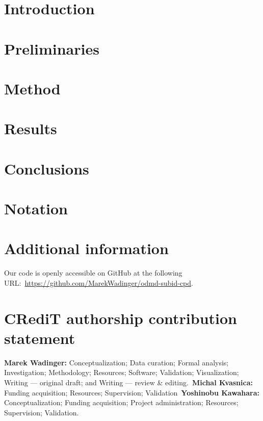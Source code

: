 \documentclass[preprint,12pt,authoryear]{elsarticle}
\begin{document}
\linenumbers{}

\section{Introduction}\label{sec:introduction}
% 

\section{Preliminaries}\label{sec:preliminaries}


\clearpage
\section{Method}\label{sec:method}


\clearpage
\section{Results}\label{sec:results}
% 

\section{Conclusions}\label{sec:conclusions}
% 

\section*{Notation}


\section*{Additional information}
Our code is openly accessible on GitHub at the following URL:~\url{https://github.com/MarekWadinger/odmd-subid-cpd}.

\section*{CRediT authorship contribution statement}
\textbf{Marek Wadinger:} Conceptualization; Data curation; Formal analysis; Investigation; Methodology; Resources; Software; Validation; Visualization; Writing --- original draft; and Writing --- review \& editing.~\textbf{Michal Kvasnica:} Funding acquisition; Resources; Supervision; Validation~\textbf{Yoshinobu Kawahara:} Conceptualization; Funding acquisition; Project administration; Resources; Supervision; Validation.
\end{document}
